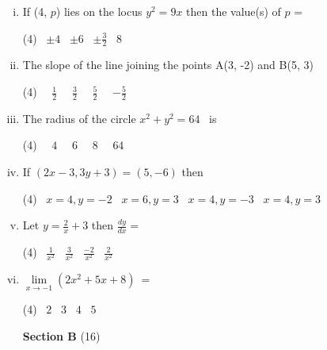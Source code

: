 \documentclass[16pt,a4paper]{article}
\begin{document}
\begin{enumerate}[i)]
\item If (4, $p$) lies on the locus $y^2 = 9x$ then the value(s) of $p$ =  
\begin{tasks}(4)
\task\ $\pm 4$
\task\ $\pm 6$
\task\ $\pm \frac{3}{2} $
\task\ $ 8$
\end{tasks}

\item The slope of the line joining the points A(3, -2) and B(5, 3)
\begin{tasks}(4)
\task\ \ $\frac{1}{2}$
\task\ \ $\frac{3}{2}$
\task\ \ $\frac{5}{2}$
\task\ \ $-\frac{5}{2}$
\end{tasks}

\item The radius of the circle $x^2 + y^2 = 64$ \ is
\begin{tasks}(4)
\task\ \ $4$
\task\ \ $6$
\task\ \ $8$
\task\ \ $64$
\end{tasks}

\item If $(2x-3,3y+3)=(5,-6)$ then 
\begin{tasks}(4)
\task\ $x=4, y=-2$
\task\ $x=6, y=3 $
\task\ $x=4, y=-3$
\task\ $x=4, y=3 $
\end{tasks}

\item Let $y = \frac{2}{x}+3$ then $\frac{dy}{dx} =$ 
\begin{tasks}(4)
\task\ $\frac{1}{x^2}$
\task\ $\frac{3}{x^2}$
\task\ $\frac{-2}{x^2}$
\task\ $\frac{2}{x^2}$
\end{tasks}

\item \(\lim\limits_{x \to -1 } ( 2x^2 + 5x + 8 )\ =  \)
\begin{tasks}(4)
\task\ $2$
\task\ $3$
\task\ $4$
\task\ $5$
\end{tasks}



\begin{center}
\hfill \textbf{Section B} \tabto{16.9cm}(16)
\end{center}
\end{enumerate}
\end{document}
